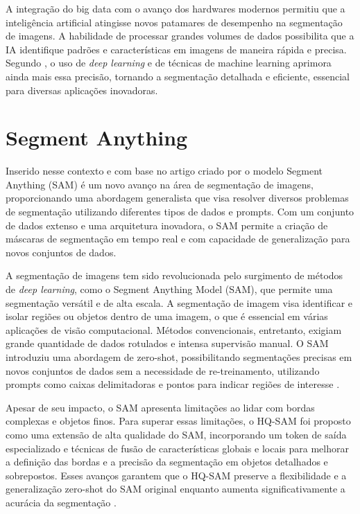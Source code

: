A integração do big data com o avanço dos hardwares modernos permitiu que a inteligência artificial atingisse novos patamares de desempenho na segmentação de imagens. A habilidade de processar grandes volumes de dados possibilita que a IA identifique padrões e características em imagens de maneira rápida e precisa. Segundo , o uso de \textit{deep learning} e de técnicas de machine learning aprimora ainda mais essa precisão, tornando a segmentação detalhada e eficiente, essencial para diversas aplicações inovadoras.

\section{Segment Anything}

Inserido nesse contexto e com base no artigo criado por \cite{kirillov2023segany} o modelo Segment Anything (SAM) é um novo avanço na área de segmentação de imagens, proporcionando uma abordagem generalista que visa resolver diversos problemas de segmentação utilizando diferentes tipos de dados e prompts. Com um conjunto de dados extenso e uma arquitetura inovadora, o SAM permite a criação de máscaras de segmentação em tempo real e com capacidade de generalização para novos conjuntos de dados.

A segmentação de imagens tem sido revolucionada pelo surgimento de métodos de \textit{deep learning}, como o Segment Anything Model (SAM), que permite uma segmentação versátil e de alta escala. A segmentação de imagem visa identificar e isolar regiões ou objetos dentro de uma imagem, o que é essencial em várias aplicações de visão computacional. Métodos convencionais, entretanto, exigiam grande quantidade de dados rotulados e intensa supervisão manual. O SAM introduziu uma abordagem de zero-shot, possibilitando segmentações precisas em novos conjuntos de dados sem a necessidade de re-treinamento, utilizando prompts como caixas delimitadoras e pontos para indicar regiões de interesse \cite{ke2023segmenthighquality}.

Apesar de seu impacto, o SAM apresenta limitações ao lidar com bordas complexas e objetos finos. Para superar essas limitações, o HQ-SAM foi proposto como uma extensão de alta qualidade do SAM, incorporando um token de saída especializado e técnicas de fusão de características globais e locais para melhorar a definição das bordas e a precisão da segmentação em objetos detalhados e sobrepostos. Esses avanços garantem que o HQ-SAM preserve a flexibilidade e a generalização zero-shot do SAM original enquanto aumenta significativamente a acurácia da segmentação \cite{ke2023segmenthighquality}.

